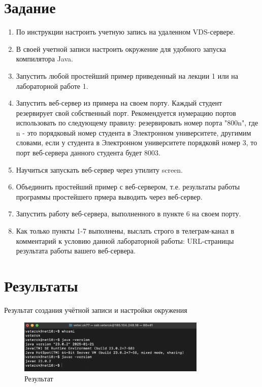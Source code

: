 \documentclass[a4paper, 14pt]{extarticle}
\begin{document}
\renewcommand{\ttdefault}{pcr}

\setlength{\tabcolsep}{3pt}
\newpage
\setcounter{page}{2}

\section{Задание}\label{Sect::task}
\begin{enumerate}[nosep]
\item По инструкции настроить учетную запись на удаленном VDS-сервере.
\item В своей учетной записи настроить окружение для удобного запуска компилятора Java.
\item Запустить любой простейший пример приведенный на лекции 1 или на лабораторной работе 1.
\item Запустить веб-сервер из примера на своем порту. Каждый студент резервирует свой собственный порт. Рекомендуется нумерацию портов использовать по следующему правилу: резервировать номер порта "800n", где n - это порядковый номер студента в Электронном университете, другимим словами, если у студента в Электронном университете порядковй номер 3, то порт веб-сервера данного студента будет 8003.
\item Научиться запускать веб-сервер через утилиту screen.
\item Объединить простейший пример с веб-сервером, т.е. результаты работы программы простейшего прмера выводить через веб-сервер.
\item Запустить работу веб-сервера, выполненного в пункте 6 на своем порту.
\item Как только пункты 1-7 выполнены, выслать строго в телеграм-канал в комментарий к условию данной лабораторной работы: URL-страницы результата работы вашего веб-сервера.
\end{enumerate}

\section{Результаты}\label{Sect::res}

Результат создания учётной записи и настройки окружения

\begin{figure}[!htb]
	\centering
	\includegraphics[width=0.8\textwidth]{images/photo1.png}
\caption{Результат}
\label{fig:photo1}
\end{figure}
\end{document}
